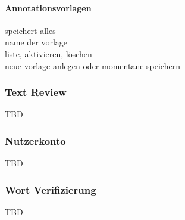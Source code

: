 \paragraph{Annotationsvorlagen}

speichert alles\\
name der vorlage\\
liste, aktivieren, löschen\\
neue vorlage anlegen oder momentane speichern\\

\subsubsection{Text Review}

TBD

\subsubsection{Nutzerkonto}

TBD

\subsubsection{Wort Verifizierung}

TBD